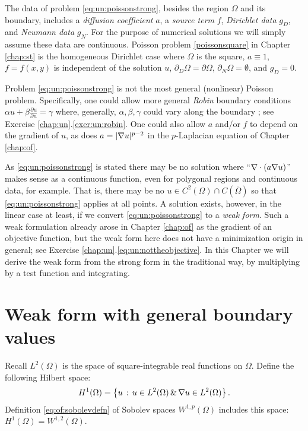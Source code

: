 The data of problem \eqref{eq:un:poissonstrong}, besides the region $\Omega$ and its boundary, includes a \emph{diffusion coefficient} $a$, a \emph{source term} $f$, \emph{Dirichlet data} $g_D$, and \emph{Neumann data} $g_N$.  For the purpose of numerical solutions we will simply assume these data are continuous.  Poisson problem \eqref{poissonsquare} in Chapter \ref{chap:st} is the homogeneous Dirichlet case where $\Omega$ is the square, $a\equiv 1$, $f=f(x,y)$ is independent of the solution $u$, $\partial_D \Omega = \partial \Omega$, $\partial_N \Omega = \emptyset$, and $g_D=0$.

Problem \eqref{eq:un:poissonstrong} is not the most general (nonlinear) Poisson problem.  Specifically, one could allow more general \emph{Robin} boundary conditions $\alpha u + \beta \frac{\partial u}{\partial n} = \gamma$ where, generally, $\alpha,\beta,\gamma$ could vary along the boundary \citep{Elmanetal2005}; see Exercise \ref{chap:un}.\ref{exer:un:robin}.  One could also allow $a$ and/or $f$ to depend on the gradient of $u$, as does $a=|\nabla u|^{p-2}$ in the $p$-Laplacian equation of Chapter \ref{chap:of}.

As \eqref{eq:un:poissonstrong} is stated there may be no solution where ``$\nabla\cdot(a\nabla u)$'' makes sense as a continuous function, even for polygonal regions and continuous data, for example.  That is, there may be no $u\in C^2(\Omega) \cap C(\overline \Omega)$ so that \eqref{eq:un:poissonstrong} applies at all points.  A solution exists, however, in the linear case at least, if we convert \eqref{eq:un:poissonstrong} to a \emph{weak form}.  Such a weak formulation already arose in Chapter \ref{chap:of} as the gradient of an objective function, but the weak form here does not have a minimization origin in general; see Exercise \ref{chap:un}.\ref{eq:un:nottheobjective}.  In this Chapter we will derive the weak form from the strong form in the traditional way, by multiplying by a test function and integrating.


\section{Weak form with general boundary values}

Recall $L^2(\Omega)$ is the space of square-integrable real functions on $\Omega$.  Define the following Hilbert space:
    $$H^1(\Omega) = \left\{u \,:\, u \in L^2(\Omega) \,\&\, \nabla u \in L^2(\Omega)\right\}.$$
Definition \eqref{eq:of:sobolevdefn} of Sobolev spaces $W^{1,p}(\Omega)$ includes this space: $H^1(\Omega) = W^{1,2}(\Omega)$.

